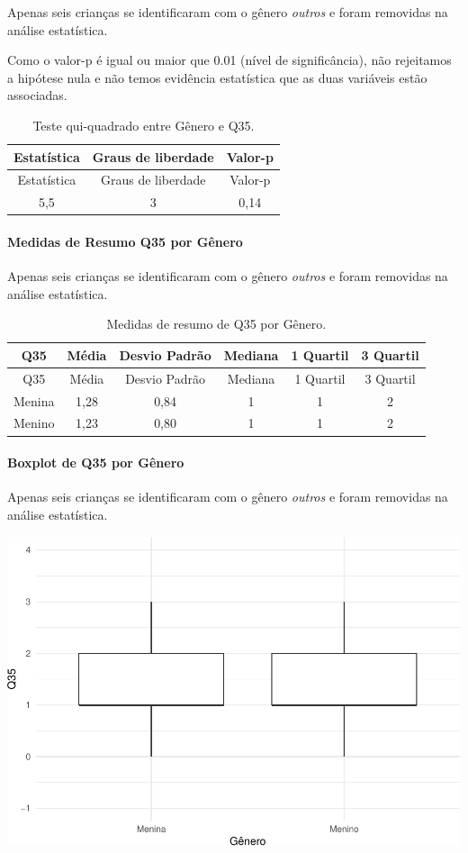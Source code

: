 \documentclass[]{article}
\let\oldparagraph\paragraph
\renewcommand{\paragraph}[1]{\oldparagraph{#1}\mbox{}}
\begin{document}
Apenas seis crianças se identificaram com o gênero \emph{outros} e foram removidas na análise estatística.

Como o valor-p é igual ou maior que 0.01 (nível de significância), não rejeitamos a hipótese nula e não temos evidência estatística que as duas variáveis estão associadas.

\begin{longtable}[]{@{}ccc@{}}
\caption{\label{tab:unnamed-chunk-1265}Teste qui-quadrado entre Gênero e Q35.}\tabularnewline
\toprule
Estatística & Graus de liberdade & Valor-p\tabularnewline
\midrule
\endfirsthead
\toprule
Estatística & Graus de liberdade & Valor-p\tabularnewline
\midrule
\endhead
5,5 & 3 & 0,14\tabularnewline
\bottomrule
\end{longtable}

\cleardoublepage

\hypertarget{medidas-de-resumo-q35-por-guxeanero}{%
\paragraph{Medidas de Resumo Q35 por Gênero}\label{medidas-de-resumo-q35-por-guxeanero}}

Apenas seis crianças se identificaram com o gênero \emph{outros} e foram removidas na análise estatística.

\begin{longtable}[]{@{}cccccc@{}}
\caption{\label{tab:unnamed-chunk-1266}Medidas de resumo de Q35 por Gênero.}\tabularnewline
\toprule
Q35 & Média & Desvio Padrão & Mediana & 1 Quartil & 3 Quartil\tabularnewline
\midrule
\endfirsthead
\toprule
Q35 & Média & Desvio Padrão & Mediana & 1 Quartil & 3 Quartil\tabularnewline
\midrule
\endhead
Menina & 1,28 & 0,84 & 1 & 1 & 2\tabularnewline
Menino & 1,23 & 0,80 & 1 & 1 & 2\tabularnewline
\bottomrule
\end{longtable}

\hypertarget{boxplot-de-q35-por-guxeanero}{%
\paragraph{Boxplot de Q35 por Gênero}\label{boxplot-de-q35-por-guxeanero}}

Apenas seis crianças se identificaram com o gênero \emph{outros} e foram removidas na análise estatística.

\begin{center}\includegraphics[width=0.75\linewidth]{relatorio_covid19_files/figure-latex/unnamed-chunk-1267-1} \end{center}
\end{document}
